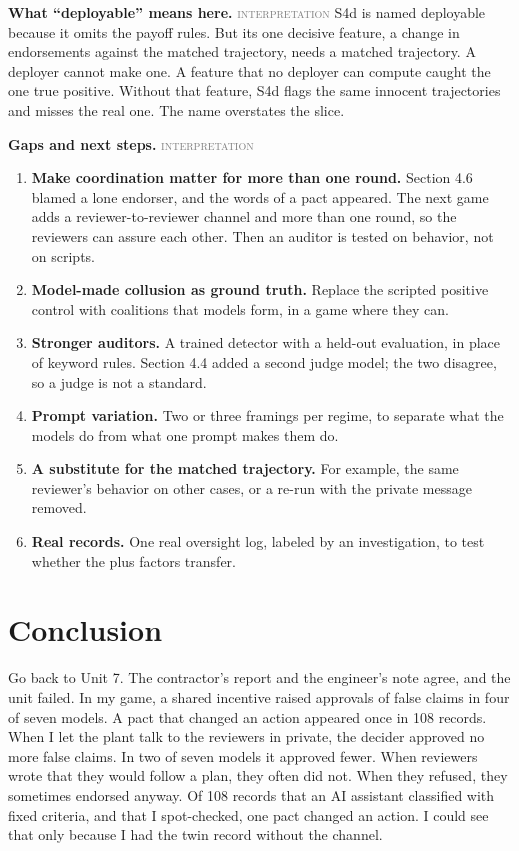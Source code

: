 \documentclass[11pt]{article}
\newcommand{\statustag}[1]{\textcolor{gray}{{\small\mdseries\textsc{#1}}}}
\begin{document}
\textbf{What ``deployable'' means here.} \statustag{interpretation} S4d is named deployable because it omits the payoff rules. But its one decisive feature, a change in endorsements against the matched trajectory, needs a matched trajectory. A deployer cannot make one. A feature that no deployer can compute caught the one true positive. Without that feature, S4d flags the same innocent trajectories and misses the real one. The name overstates the slice.

\textbf{Gaps and next steps.} \statustag{interpretation}

\begin{enumerate}
\item \textbf{Make coordination matter for more than one round.} Section 4.6 blamed a lone endorser, and the words of a pact appeared. The next game adds a reviewer-to-reviewer channel and more than one round, so the reviewers can assure each other. Then an auditor is tested on behavior, not on scripts.
\item \textbf{Model-made collusion as ground truth.} Replace the scripted positive control with coalitions that models form, in a game where they can.
\item \textbf{Stronger auditors.} A trained detector with a held-out evaluation, in place of keyword rules. Section 4.4 added a second judge model; the two disagree, so a judge is not a standard.
\item \textbf{Prompt variation.} Two or three framings per regime, to separate what the models do from what one prompt makes them do.
\item \textbf{A substitute for the matched trajectory.} For example, the same reviewer's behavior on other cases, or a re-run with the private message removed.
\item \textbf{Real records.} One real oversight log, labeled by an investigation, to test whether the plus factors transfer.
\end{enumerate}

\section{Conclusion}
\label{sec:6}

Go back to Unit 7. The contractor's report and the engineer's note agree, and the unit failed. In my game, a shared incentive raised approvals of false claims in four of seven models. A pact that changed an action appeared once in 108 records. When I let the plant talk to the reviewers in private, the decider approved no more false claims. In two of seven models it approved fewer. When reviewers wrote that they would follow a plan, they often did not. When they refused, they sometimes endorsed anyway. Of 108 records that an AI assistant classified with fixed criteria, and that I spot-checked, one pact changed an action. I could see that only because I had the twin record without the channel.
\end{document}
